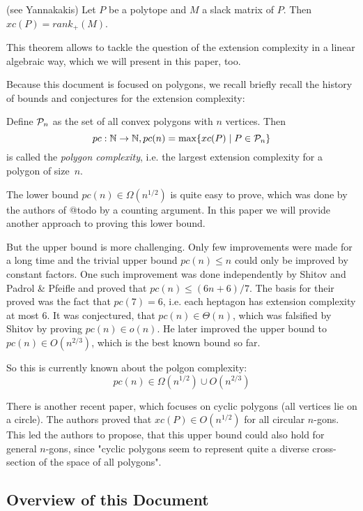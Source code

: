 \begin{theorem}(see Yannakakis)
  Let $P$ be a polytope and $M$ a slack matrix of $P$. Then $xc(P) = rank_+(M)$.
\end{theorem}

This theorem allows to tackle the question of the extension complexity in a linear algebraic way, which we will present in this paper, too.

Because this document is focused on polygons, we recall briefly recall the history of bounds and conjectures for the extension complexity:

Define $\P_n$ as the set of all convex polygons with $n$ vertices. Then $$pc:\N \to \N, pc(n) = \max \{xc(P) \mid P \in \P_n\}$$ is called the \textit{polygon complexity}, i.e. the largest extension complexity for a polygon of size~$n$.

The lower bound $pc(n) \in \Omega(n^{1/2})$ is quite easy to prove, which was done by the authors of @todo by a counting argument. In this paper we will provide another approach to proving this lower bound. 

But the upper bound is more challenging. Only few improvements were made for a long time and the trivial upper bound $pc(n) \leq n$ could only be improved by constant factors. One such improvement was done independently by Shitov and Padrol \& Pfeifle and proved that $pc(n) \leq (6n+6)/7$. The basis for their proved was the fact that $pc(7)=6$, i.e. each heptagon has extension complexity at most 6.
It was conjectured, that $pc(n) \in \Theta(n)$, which was falsified by Shitov by proving $pc(n) \in o(n)$. He later improved the upper bound to $pc(n) \in O(n^{2/3})$, which is the best known bound so far.

So this is currently known about the polgon complexity:
$$pc(n) \in \Omega(n^{1/2}) \cup O(n^{2/3})$$

There is another recent paper, which focuses on cyclic polygons (all vertices lie on a circle). The authors proved that $xc(P) \in O(n^{1/2})$ for all circular $n$-gons. 
This led the authors to propose, that this upper bound could also hold for general $n$-gons, since "cyclic polygons seem to represent quite a diverse cross-section of the space of all polygons".



\subsection{Overview of this Document}


